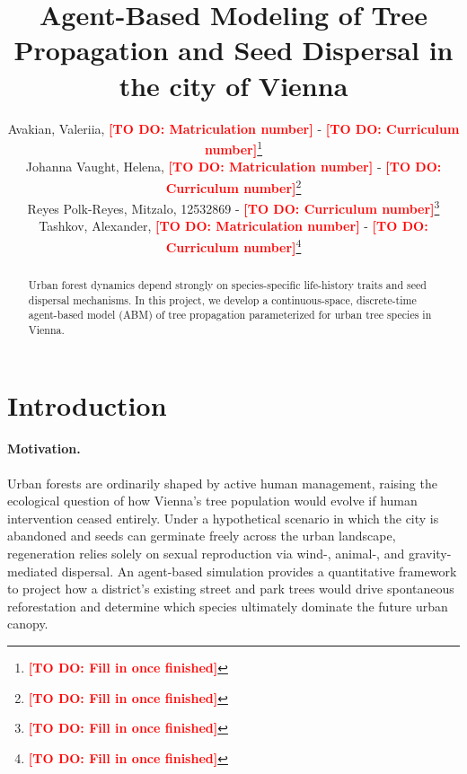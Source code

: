 \documentclass[a4paper,11pt]{scrartcl}
\DeclareRobustCommand{\todo}[1]{\textcolor{red}{\textbf{[TO DO: #1]}}}
\begin{document}
\subject{101.433 Modeling and Simulation (W2026)}
\title{Agent-Based Modeling of Tree Propagation and Seed Dispersal in the city of Vienna}

\publishers{Supervisor: Pernthaner, Hannah}
\author{
    Avakian, Valeriia, \todo{Matriculation number} - \todo{Curriculum number}\footnote{\todo{Fill in once finished}}\\
    Johanna Vaught, Helena, \todo{Matriculation number} - \todo{Curriculum number}\footnote{\todo{Fill in once finished}}\\
    Reyes Polk-Reyes, Mitzalo, 12532869 - \todo{Curriculum number}\footnote{\todo{Fill in once finished}}\\
    Tashkov, Alexander, \todo{Matriculation number} - \todo{Curriculum number}\footnote{\todo{Fill in once finished}}
}

\maketitle

\begin{abstract}
Urban forest dynamics depend strongly on species-specific life-history traits and seed dispersal mechanisms. In this project, we develop a continuous-space, discrete-time agent-based model (ABM) of tree propagation parameterized for urban tree species in Vienna.
\end{abstract}

\newpage

\tableofcontents

\newpage

\section{Introduction}
\paragraph{Motivation.}
Urban forests are ordinarily shaped by active human management, raising the ecological question of how Vienna's tree population would evolve if human intervention ceased entirely. Under a hypothetical scenario in which the city is abandoned and seeds can germinate freely across the urban landscape, regeneration relies solely on sexual reproduction via wind-, animal-, and gravity-mediated dispersal. An agent-based simulation provides a quantitative framework to project how a district's existing street and park trees would drive spontaneous reforestation and determine which species ultimately dominate the future urban canopy.
\end{document}
